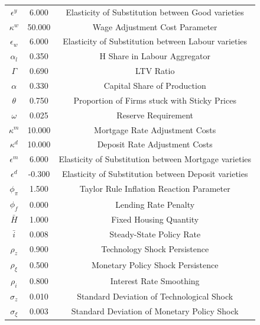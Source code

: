 \begin{center}
\begin{longtable}{ccc}
$\epsilon^y$ 	 & 	 6.000 	 & 	 Elasticity of Substitution between Good varieties\\
$\kappa^w$ 	 & 	 50.000 	 & 	 Wage Adjustment Cost Parameter\\
$\epsilon_w$ 	 & 	 6.000 	 & 	 Elasticity of Substitution between Labour varieties\\
$\alpha_l$ 	 & 	 0.350 	 & 	 H Share in Labour Aggregator\\
$\Gamma$ 	 & 	 0.690 	 & 	 LTV Ratio\\
$\alpha$ 	 & 	 0.330 	 & 	 Capital Share of Production\\
$\theta$ 	 & 	 0.750 	 & 	 Proportion of Firms stuck with Sticky Prices\\
$\omega$ 	 & 	 0.025 	 & 	 Reserve Requirement\\
$\kappa^m$ 	 & 	 10.000 	 & 	 Mortgage Rate Adjustment Costs\\
$\kappa^d$ 	 & 	 10.000 	 & 	 Deposit Rate Adjustment Costs\\
$\epsilon^m$ 	 & 	 6.000 	 & 	 Elasticity of Substitution between Mortgage varieties\\
$\epsilon^d$ 	 & 	 -0.300 	 & 	 Elasticity of Substitution between Deposit varieties\\
$\phi_\pi$ 	 & 	 1.500 	 & 	 Taylor Rule Inflation Reaction Parameter\\
$\phi_f$ 	 & 	 0.000 	 & 	 Lending Rate Penalty\\
$\bar{H}$ 	 & 	 1.000 	 & 	 Fixed Housing Quantity\\
$\bar{i}$ 	 & 	 0.008 	 & 	 Steady-State Policy Rate\\
$\rho_z$ 	 & 	 0.900 	 & 	 Technology Shock Persistence\\
$\rho_\xi$ 	 & 	 0.500 	 & 	 Monetary Policy Shock Persistence\\
$\rho_i$ 	 & 	 0.800 	 & 	 Interest Rate Smoothing\\
$\sigma_z$ 	 & 	 0.010 	 & 	 Standard Deviation of Technological Shock\\
$\sigma_\xi$ 	 & 	 0.003 	 & 	 Standard Deviation of Monetary Policy Shock\\
\bottomrule%
\end{longtable}
\end{center}
